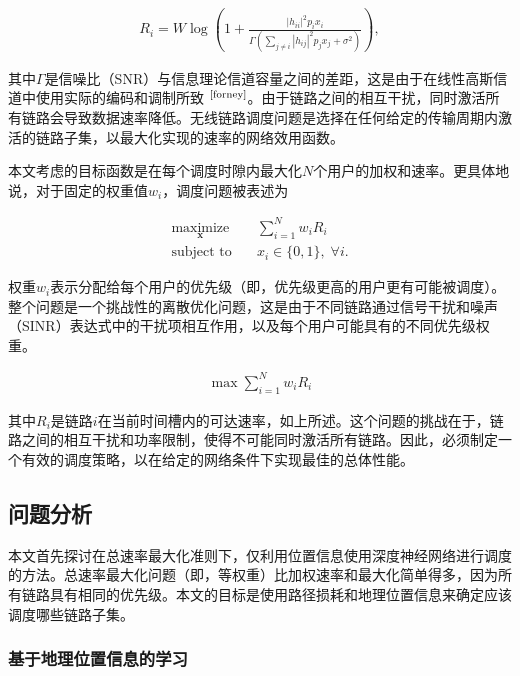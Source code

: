 \documentclass[UTF8, 12pt]{article}
\numberwithin{figure}{section}
\newcommand{\upcite}[1]{$^{\scriptsize \cite{#1}}$}
\begin{document}
\begin{align}
R_i =W\log\left(1+\frac{|h_{ii}|^2p_ix_i}{\Gamma(\sum_{j\neq i}|h_{ij}|^2 p_jx_j + \sigma^2)}\right),
\end{align}

其中$\Gamma$是信噪比（SNR）与信息理论信道容量之间的差距，这是由于在线性高斯信道中使用实际的编码和调制所致 \upcite{forney}。由于链路之间的相互干扰，同时激活所有链路会导致数据速率降低。无线链路调度问题是选择在任何给定的传输周期内激活的链路子集，以最大化实现的速率的网络效用函数。

本文考虑的目标函数是在每个调度时隙内最大化$N$个用户的加权和速率。更具体地说，对于固定的权重值$w_i$，调度问题被表述为

\begin{subequations}
  \label{prob}
  \begin{align}
  \underset{\mathbf{x}}{\text{maximize}}\quad&
  \sum^N_{i=1} w_i R_i\\
  \text{subject to}\quad& x_i \in \{0,1\},\;\forall i.
  \end{align}
  \end{subequations}

权重$w_i$表示分配给每个用户的优先级（即，优先级更高的用户更有可能被调度）。整个问题是一个挑战性的离散优化问题，这是由于不同链路通过信号干扰和噪声（SINR）表达式中的干扰项相互作用，以及每个用户可能具有的不同优先级权重。

\begin{align}
\max \sum_{i=1}^N w_i R_i
\end{align}

其中$R_i$是链路$i$在当前时间槽内的可达速率，如上所述。这个问题的挑战在于，链路之间的相互干扰和功率限制，使得不可能同时激活所有链路。因此，必须制定一个有效的调度策略，以在给定的网络条件下实现最佳的总体性能。

\clearpage 

\subsection{问题分析}

本文首先探讨在总速率最大化准则下，仅利用位置信息使用深度神经网络进行调度的方法。总速率最大化问题（即，等权重）比加权速率和最大化简单得多，因为所有链路具有相同的优先级。本文的目标是使用路径损耗和地理位置信息来确定应该调度哪些链路子集。

  \subsubsection{基于地理位置信息的学习}
\end{document}
